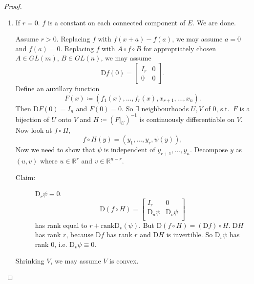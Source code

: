 \documentclass[12pt]{article}
\theoremstyle{plain}
\theoremstyle{definition}
\begin{document}
\begin{proof}
    \begin{enumerate}
        \item
            If $r=0$.
            $f$ is a constant on each connected component of $E$.
            We are done.

            Assume $r>0$.
            Replacing $f$ with $f(x+a)-f(a)$, we may assume $a=0$ and $f(a) = 0$.
            Replacing $f$ with $A\circ f\circ B$ for appropriately chosen $A\in GL(m)$, $B\in GL(n)$, we may assume
            \[
                \mathrm{D}f(0) = \begin{bmatrix}
                    I_r&0\\
                    0&0
                \end{bmatrix}.
            \]
            Define an auxillary function
            \[
                F(x)\coloneqq (f_1(x), \ldots, f_r(x),x_{r+1},\ldots,x_n).
            \]
            Then $\mathrm{D}F(0) = I_n$ and $F(0) = 0$.
            So $\exists$ neighbourhoods $U, V$ of $0$, s.t.\ $F$ is a bijection of $U$ onto $V$ and $H\coloneqq (F|_U)^{-1}$ is continuously
            differentiable on $V$.
            Now look at $f\circ H$,
            \[
                f\circ H(y) = (y_1,\ldots,y_r,\psi(y)),
            \]
            Now we need to show that $\psi$ is independent of $y_{r+1},...,y_n$.
            Decompose $y$ as $(u, v)$ where $u\in\mathbb{R}^r$ and $v\in\mathbb{R}^{n-r}$.
            \begin{description}
                \item[Claim: ]$\mathrm{D}_r\psi \equiv 0$.\\
                    \[
                        \mathrm{D}(f\circ H) = \begin{bmatrix}
                            I_r&0\\
                            \mathrm{D}_u\psi&\mathrm{D}_v\psi\\
                        \end{bmatrix}
                    \]
                    has rank equal to $r+\text{rank}\mathrm{D}_v(\psi)$.
                    But $\mathrm{D}(f\circ H) = (\mathrm{D}f)\circ H$.
                    $\mathrm{D}H$ has rank $r$, because $\mathrm{D}f$ has rank $r$ and $\mathrm{D}H$ is invertible.
                    So $\mathrm{D}_v\psi$ has rank $0$, i.e.
                    $\mathrm{D}_v\psi\equiv 0$.
            \end{description}
            Shrinking $V$, we may assume $V$ is convex.

\end{enumerate}
\end{proof}
\end{document}
